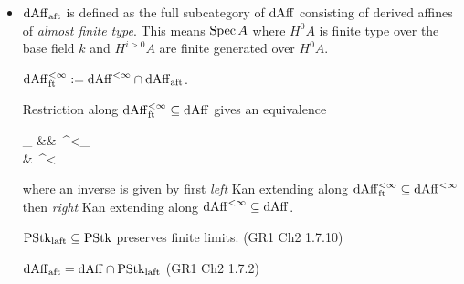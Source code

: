 \documentclass[./main.tex]{subfiles}
\begin{document}
\begin{itemize}
	\item $\mathrm{dAff}_{\mathrm{aft}}$ is defined as the full subcategory of $\mathrm{dAff}$
  consisting of derived affines of \emph{almost finite type}.
	This means $\mathrm{Spec}\,A$ where $H^0 A$ is finite type over the base field $k$
	and $H^{i > 0} A$ are finite generated over $H^0 A$.

	$\mathrm{dAff}^{<\infty}_{\mathrm{ft}} := \mathrm{dAff}^{<\infty} \cap \mathrm{dAff}_{\mathrm{aft}}$.

	\begin{prop}
		
		Restriction along $\mathrm{dAff}^{<\infty}_{\mathrm{ft}} \subseteq \mathrm{dAff}$
		gives an equivalence \begin{cd}
			{\PSTK_\LAFT} && {\PSH\,\DAFF^{<\infty}_\FT} \\
			& {\PSH\,\DAFF^{<\infty}}
			\arrow["{\mathrm{res}}", shift left=2, from=1-1, to=1-3]
			\arrow["\sim"{description}, draw=none, from=1-1, to=1-3]
			\arrow[shift left=2, from=1-3, to=1-1]
			\arrow["\RAN", shorten >=3pt, from=2-2, to=1-1]
			\arrow["\LAN", shorten <=4pt, from=1-3, to=2-2]
		\end{cd}
		where an inverse is given by 
		first \emph{left} Kan extending along 
		$\mathrm{dAff}^{<\infty}_{\mathrm{ft}} \subseteq \mathrm{dAff}^{<\infty}$
		then \emph{right} Kan extending along $\mathrm{dAff}^{<\infty} \subseteq \mathrm{dAff}$.
	\end{prop}

	$\mathrm{PStk}_{\mathrm{laft}} \subseteq \mathrm{PStk}$ preserves finite limits.
	(GR1 Ch2 1.7.10)

	$\mathrm{dAff}_{\mathrm{aft}} = \mathrm{dAff} \cap \mathrm{PStk}_{\mathrm{laft}}$ (GR1 Ch2 1.7.2)

\end{itemize}
\end{document}
